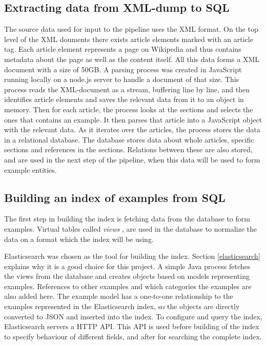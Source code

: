 \subsection{Extracting data from XML-dump to SQL}
The source data used for input to the pipeline uses the XML format. On the top level of the XML douments there exists article elements marked with an article tag. Each article element represents a page on Wikipedia and thus contains metadata about the page as well as the content itself. All this data forms a XML document with a size of 50GB.
A parsing process was created in JavaScript running locally on a node.js server to handle a document of that size. This process reads the XML-document as a stream, buffering line by line, and then identifies article elements and saves the relevant data from it to an object in memory. Then for each article, the process looks at the sections and selects the ones that contains an example. It then parses that article into a JavaScript object with the relevant data. As it iterates over the articles, the process stores the data in a relational database. The database stores data about whole articles, specific sections and references in the sections. Relations between these are also stored, and are used in the next step of the pipeline, when this data will be used to form example entities. 

\subsection{Building an index of examples from SQL}
The first step in building the index is fetching data from the database to form examples. Virtual tables called \textit{views}%
, are used in the database to normalize%
 the data on a format which the index will be using.

Elasticsearch was chosen as the tool for building the index. Section \ref{elasticsearch} explains why it is a good choice for this project. A simple Java process fetches the views from the database and creates objects based on models representing examples. References to other examples and which categories the examples are also added here. The example model has a one-to-one relationship to the examples represented in the Elasticsearch index, so the objects are directly converted to JSON and inserted into the index. To configure and query the index, Elasticsearch servers a HTTP API. This API is used before building of the index to specify behaviour of different fields, and after for searching the complete index.


